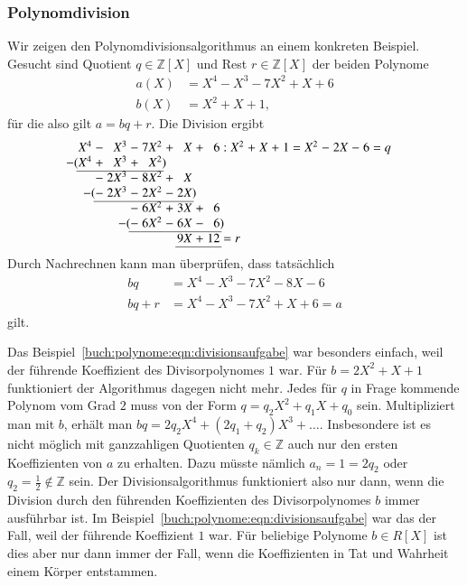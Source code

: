 \subsubsection{Polynomdivision}
Wir zeigen den Polynomdivisionsalgorithmus an einem konkreten Beispiel.
%
Gesucht sind Quotient $q\in \mathbb{Z}[X]$ und Rest $r\in\mathbb{Z}[X]$
der beiden Polynome
\begin{equation}
\begin{aligned}
a(X) &= X^4 - X^3 -7X^2 + X + 6\\
b(X) &= X^2+X+1,
\end{aligned}
\label{buch:polynome:eqn:divisionsaufgabe}
\end{equation}
für die also gilt $a=bq+r$.
Die Division ergibt
\[
\arraycolsep=1.4pt
\begin{array}{rcrcrcrcrcrcrcrcrcrcr}
X^4&-& X^3&-&7X^2&+& X&+&6&:&X^2&+&X&+&1&=&X^2&-&2X&-&6=q\\
\llap{$-($}X^4&+& X^3&+& X^2\rlap{$)$}& &  & & & &   & & & & & &   & &  & & \\ \cline{1-5}
   &-&2X^3&-&8X^2&+& X& & & &   & & & & & &   & &  & & \\
   &\llap{$-($}-&2X^3&-&2X^2&-&2X\rlap{$)$}& & & &   & & & & & &   & &  & & \\ \cline{2-7}
   & &    &-&6X^2&+&3X&+&6& &   & & & & & &   & &  & & \\
   & &    &\llap{$-($}-&6X^2&-&6X&-&6\rlap{$)$}& &   & & & & & &   & &  & & \\ \cline{4-9}
   & &    & &    & &9X&+&12\rlap{$\mathstrut=r$}& &   & & & & & &   & &  & & \\ \cline{7-9}
\end{array}
\]
Durch Nachrechnen kann man überprüfen, dass tatsächlich
\begin{align*}
bq
&=
X^4-X^3-7X^2-8X-6
\\
bq+r&=
X^4-X^3-7X^2+X+6 = a
\end{align*}
gilt.

Das Beispiel~\eqref{buch:polynome:eqn:divisionsaufgabe} war besonders
einfach, weil der führende Koeffizient des Divisorpolynomes $1$ war.
Für $b=2X^2+X+1$ funktioniert der Algorithmus dagegen nicht mehr.
Jedes für $q$ in Frage kommende Polynom vom Grad $2$ muss von der
Form $q=q_2X^2+q_1X+q_0$ sein.
Multipliziert man mit $b$, erhält man $bq=2q_2X^4 + (2q_1+q_2)X^3+\dots$.
Insbesondere ist es nicht möglich mit ganzzahligen Quotienten
$q_k\in\mathbb{Z}$ auch nur den ersten Koeffizienten von $a$ zu
erhalten.
Dazu müsste nämlich $a_n = 1 = 2q_2$ oder $q_2 = \frac12\not\in\mathbb{Z}$
sein.
Der Divisionsalgorithmus funktioniert also nur dann, wenn die 
Division durch den führenden Koeffizienten des Divisorpolynomes $b$ 
immer ausführbar ist.
Im Beispiel~\eqref{buch:polynome:eqn:divisionsaufgabe} war das der
Fall, weil der führende Koeffizient $1$ war.
Für beliebige Polynome $b\in R[X]$ ist dies aber nur dann immer der Fall,
wenn die Koeffizienten in Tat und Wahrheit einem Körper entstammen.

